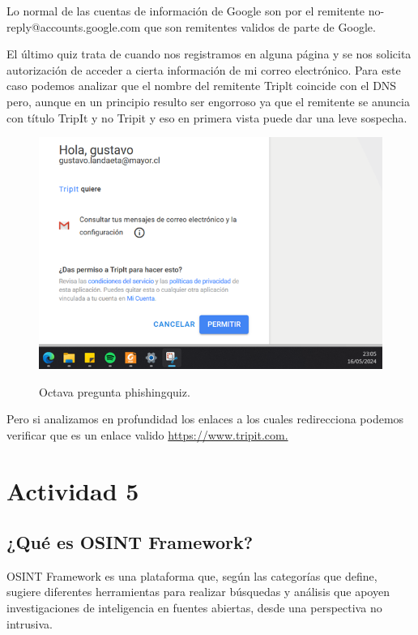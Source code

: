 \documentclass[stu, 11pt, letterpaper, donotrepeattitle, floatsintext, natbib]{apa7}
\begin{document}
Lo normal de las cuentas de información de Google son por el remitente no-reply@accounts.google.com que son remitentes validos de parte de Google.

El último quiz trata de cuando nos registramos en alguna página y se nos solicita autorización de acceder a cierta información de mi correo electrónico. Para este caso podemos analizar que el nombre del remitente Triplt coincide con el DNS pero, aunque en un principio resulto ser engorroso ya que el remitente se anuncia con título TripIt y no Tripit y eso en primera vista puede dar una leve sospecha.

\begin{figure}[H]
    \centering
    \caption{Octava pregunta phishingquiz.}
    \includegraphics[width=0.75\linewidth]{phishing11.png} %
    \label{fig:OverallEffect}
\end{figure}

Pero si analizamos en profundidad los enlaces a los cuales redirecciona podemos verificar que es un enlace valido \url{https://www.tripit.com.}

\newpage

\section{\large Actividad 5}

\subsection{¿Qué es OSINT Framework?}

OSINT Framework es una plataforma que, según las categorías que define, sugiere diferentes herramientas para realizar búsquedas y análisis que apoyen investigaciones de inteligencia en fuentes abiertas, desde una perspectiva no intrusiva.
\end{document}
